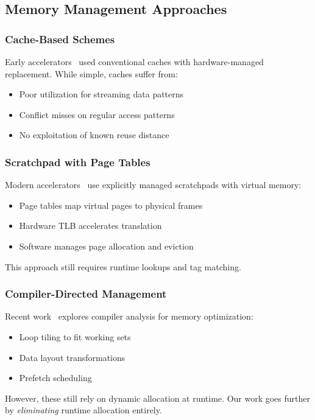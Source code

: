 \documentclass[conference]{IEEEtran}
\begin{document}
\subsection{Memory Management Approaches}

\subsubsection{Cache-Based Schemes}
Early accelerators~\cite{zhang2015optimizing} used conventional caches with hardware-managed replacement. While simple, caches suffer from:
\begin{itemize}
\item Poor utilization for streaming data patterns
\item Conflict misses on regular access patterns
\item No exploitation of known reuse distance
\end{itemize}

\subsubsection{Scratchpad with Page Tables}
Modern accelerators~\cite{chen2016eyeriss} use explicitly managed scratchpads with virtual memory:
\begin{itemize}
\item Page tables map virtual pages to physical frames
\item Hardware TLB accelerates translation
\item Software manages page allocation and eviction
\end{itemize}

This approach still requires runtime lookups and tag matching.

\subsubsection{Compiler-Directed Management}
Recent work~\cite{kwon2019understanding, param2020compiler} explores compiler analysis for memory optimization:
\begin{itemize}
\item Loop tiling to fit working sets
\item Data layout transformations
\item Prefetch scheduling
\end{itemize}

However, these still rely on dynamic allocation at runtime. Our work goes further by \textit{eliminating} runtime allocation entirely.
\end{document}

